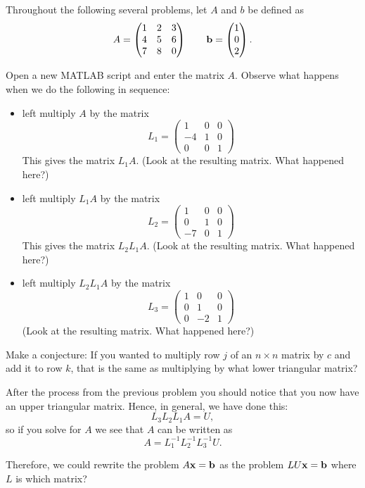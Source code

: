 Throughout the following several problems, let $A$ and $b$ be defined as
\[ A = \begin{pmatrix} 1 & 2 & 3 \\ 4 & 5 & 6 \\ 7 & 8 & 0 \end{pmatrix} \qquad {\bf b} =
\begin{pmatrix} 1 \\ 0 \\ 2 \end{pmatrix}. \]
\begin{problem}
    Open a new MATLAB script and enter the matrix $A$.  Observe what happens when we do the following in sequence:
    \begin{itemize}
        \item left multiply $A$ by the matrix
            \[ L_1 = \begin{pmatrix} 1 & 0 & 0 \\ -4 & 1 & 0 \\ 0 & 0 & 1 \end{pmatrix} \]
            This gives the matrix $L_1 A$.  (Look at the resulting matrix.  What happened here?)
        \item left multiply $L_1 A$ by the matrix
            \[ L_2 = \begin{pmatrix} 1 & 0 & 0 \\ 0 & 1 & 0 \\ -7 & 0 & 1 \end{pmatrix} \]
            This gives the matrix $L_2 L_1 A$.  (Look at the resulting matrix.  What happened here?)
        \item left multiply $L_2 L_1 A$ by the matrix 
            \[ L_3 = \begin{pmatrix} 1 & 0 & 0 \\ 0 & 1 & 0 \\ 0 & -2 & 1 \end{pmatrix} \]
            (Look at the resulting matrix.  What happened here?)
    \end{itemize}
\end{problem}

\begin{problem}
    Make a conjecture: If you wanted to multiply row $j$ of an $n\times n$ matrix by $c$
    and add it to row $k$, that is the same as multiplying by what lower triangular
    matrix?
\end{problem}

\begin{problem}
    After the process from the previous problem you should notice that you now have an
    upper triangular matrix.  Hence, in general, we have done this:
    \[ L_3 L_2 L_1 A = U, \]
    so if you solve for $A$ we see that $A$ can be written as
    \[ A = L_1^{-1} L_2^{-1} L_3^{-1} U. \]
    
    Therefore, we could rewrite the problem $A {\bf x} = {\bf b}$ as the
    problem $LU{\bf x} = {\bf b}$ where $L$ is which matrix?
\end{problem}


